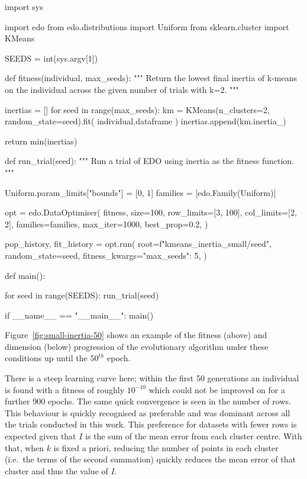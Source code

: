 \begin{listing}[htbp]
\begin{sourcepy}
import sys

import edo
from edo.distributions import Uniform
from sklearn.cluster import KMeans


SEEDS = int(sys.argv[1])


def fitness(individual, max_seeds):
    """ Return the lowest final inertia of k-means on the individual
    across the given number of trials with k=2. """

    inertias = []
    for seed in range(max_seeds):
        km = KMeans(n_clusters=2, random_state=seed).fit(
            individual.dataframe
        )
        inertias.append(km.inertia_)

    return min(inertias)


def run_trial(seed):
    """ Run a trial of EDO using inertia as the fitness function. """

    Uniform.param_limits["bounds"] = [0, 1]
    families = [edo.Family(Uniform)]

    opt = edo.DataOptimiser(
        fitness,
        size=100,
        row_limits=[3, 100],
        col_limits=[2, 2],
        families=families,
        max_iter=1000,
        best_prop=0.2,
    )

    pop_history, fit_history = opt.run(
        root=f"kmeans_inertia_small/{seed}",
        random_state=seed,
        fitness_kwargs={"max_seeds": 5},
    )


def main():

    for seed in range(SEEDS):
        run_trial(seed)


if __name__ == "__main__":
    main()
\end{sourcepy}
\caption{%
    An abridged version of the source code used to produce the data from the
    first example
}\label{snp:inertia}
\end{listing}

Figure~\ref{fig:small-inertia-50} shows an example of the fitness (above) and
dimension (below) progression of the evolutionary algorithm under these
conditions up until the \(50^{th}\) epoch.

There is a steep learning curve here; within the first 50 generations an
individual is found with a fitness of roughly \(10^{-10}\) which could not be
improved on for a further 900 epochs. The same quick convergence is seen in the
number of rows. This behaviour is quickly recognised as preferable and was
dominant across all the trials conducted in this work. This preference for
datasets with fewer rows is expected given that \(I\) is the sum of the mean
error from each cluster centre. With that, when \(k\) is fixed a priori,
reducing the number of points in each cluster (i.e.\ the terms of the second
summation) quickly reduces the mean error of that cluster and thus the value of
\(I\).

